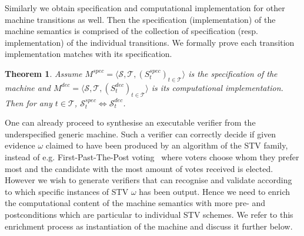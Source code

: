 \documentclass[10pt,conference]{IEEEtran}
\newtheorem{theorem}{Theorem}
\begin{document}
Similarly  
we obtain specification and computational implementation for other machine transitions as well. Then the specification (implementation) of the machine semantics is comprised of the collection of specification (resp. implementation) of the individual transitions. We formally prove 
each transition implementation  matches with its specification.
\begin{theorem}
Assume $M^{spec} = \langle \mathcal{S}, \mathcal{T}, (S_{t}^{spec})_{t \in \mathcal{T}} \rangle$ is the specification of the machine and  $M^{dec} = \langle \mathcal{S}, \mathcal{T}, (S_{t}^{dec})_{t \in \mathcal{T}} \rangle$ is its computational implementation. Then for any $t\in\mathcal{T}$,  $\mathcal{S}_{t}^{spec}\Leftrightarrow\mathcal{S}_{t}^{dec}$.      
\end{theorem}

One can already proceed to synthesise an executable verifier from
the underspecified generic machine. Such a verifier can correctly decide if given evidence
$\omega$ claimed to have been produced by an algorithm of the STV
family,  instead of e.g. First-Past-The-Post
voting~\cite{DFar} where voters choose whom they prefer most and the
candidate with the most amount of votes received is elected.
However we wish to generate verifiers that can recognise and
validate according to which specific instances of STV  
$\omega$ has been output. Hence we need to enrich the computational
content of the machine semantics with more  pre- and postconditions
which are particular to individual STV schemes. We refer to this
enrichment process as instantiation of the machine and discuss it
further below.
\end{document}
